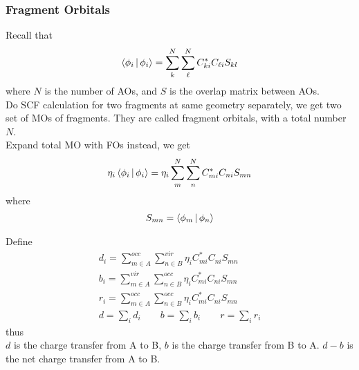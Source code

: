 \documentclass[10pt,aspectratio=43]{beamer}
\numberwithin{equation}{section}
\begin{document}
\begin{frame}
\frametitle{Fragment Orbitals}
Recall that
\begin{equation}\label{key}
\Braket{\phi_i | \phi_i} = \sum_k^N \sum_\ell^N C_{ki}^* C_{\ell i} S_{kl}
\end{equation}
where $ N $ is the number of AOs, and $ S $ is the overlap matrix between AOs. \\
Do SCF calculation for two fragments at same geometry separately, we get two set of MOs of fragments. They are called fragment orbitals, with a total number $ N $.\\
Expand total MO with FOs instead, we get
\begin{equation}\label{key}
\eta_i\Braket{\phi_i | \phi_i} = \eta_i\sum_m^N \sum_n^N C_{mi}^* C_{ni} S_{mn}
\end{equation}
where
\begin{align}\label{key}
S_{mn} = \Braket{\phi_m | \phi_n}
\end{align}

\end{frame}

\begin{frame}
Define
\begin{align}
d_i = \sum_{m\in A}^{occ} \sum_{n\in B}^{vir} \eta_i C_{mi}^* C_{ni} S_{mn}\\
b_i = \sum_{m\in A}^{vir} \sum_{n\in B}^{occ} \eta_i C_{mi}^* C_{ni} S_{mn}\\
r_i = \sum_{m\in A}^{occ} \sum_{n\in B}^{occ} \eta_i C_{mi}^* C_{ni} S_{mn}\\
d = \sum_i d_i \qquad b = \sum_i b_i \qquad r = \sum_i r_i
\end{align}
thus\\
$ d $ is the charge transfer from A to B, $ b $ is the charge transfer from B to A. $ d-b $ is the net charge transfer from A to B.

\end{frame}


	
\end{document}
